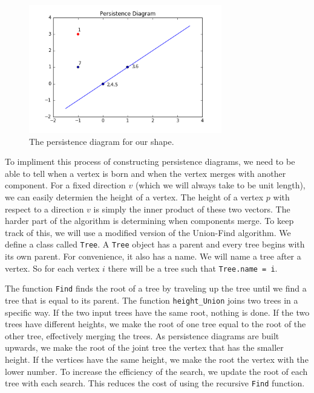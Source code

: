 \documentclass[codesnippet]{jss}
\begin{document}
\begin{figure}
\centering
\includegraphics[width = 0.75\textwidth]{../diagram.png}
\caption{\label{diagram} The persistence diagram for our shape.}
\end{figure}


To impliment this process of constructing persistence diagrams, we need to be able to tell when a vertex is born and when the vertex merges with another component.  For a fixed direction $v$ (which we will always take to be unit length), we can easily determien the height of a vertex. The height of a vertex $p$ with respect to a direction $v$ is simply the inner product of these two vectors.  The harder part of the algorithm is determining when components merge.  To keep track of this, we will use a modified version of the Union-Find algorithm.  We define a class called \texttt{Tree}.  A \texttt{Tree} object has a parent and every tree begins with its own parent.  For convenience, it also has a name.  We will name a tree after a vertex.  So for each vertex $i$ there will be a tree such that \texttt{Tree.name = i}.  

The function \texttt{Find} finds the root of a tree by traveling up the tree until we find a tree that is equal to its parent.  The function \texttt{height\_Union} joins two trees in a specific way.  If the two input trees have the same root, nothing is done.  If the two trees have different heights, we make the root of one tree equal to the root of the other tree, effectively merging the trees.  As persistence diagrams are built upwards, we make the root of the joint tree the vertex that has the smaller height.  If the vertices have the same height, we make the root the vertex with the lower number.  To increase the efficiency of the search, we update the root of each tree with each search. This reduces the cost of using the recursive \texttt{Find} function.  
\end{document}
